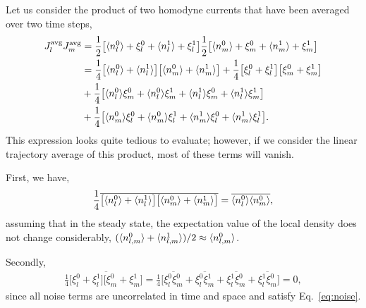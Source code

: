 Let us consider the product of two homodyne currents that have been averaged over two time steps, 
\begin{align}
\begin{split}
\label{eq:prodJ_expand}
    J_l^\text{avg} J_m^\text{avg} &= \frac{1}{2} \big[ \langle n_l^0\rangle + \xi_l^0 + \langle n_l^1\rangle + \xi_l^1 \big] \frac{1}{2} \big[ \langle n_m^0\rangle + \xi_m^0 + \langle n_m^1\rangle + \xi_m^1 \big] \\
    &= \frac{1}{4} \big[ \langle n_l^0\rangle + \langle n_l^1\rangle \big] \big[ \langle n_m^0\rangle + \langle n_m^1\rangle \big] + \frac{1}{4} \big[ \xi_l^0 + \xi_l^1 \big] \big[ \xi_m^0 + \xi_m^1 \big] \\
    &+ \frac{1}{4} \big[\langle n_l^0\rangle \xi_m^0 + \langle n_l^0\rangle \xi_m^1 + \langle n_l^1\rangle \xi_m^0 + \langle n_l^1\rangle \xi_m^1  \big] \\
    &+ \frac{1}{4} \big[\langle n_m^0\rangle \xi_l^0 + \langle n_m^0\rangle \xi_l^1 + \langle n_m^1\rangle \xi_l^0 + \langle n_m^1\rangle \xi_l^1  \big].
\end{split}
\end{align}
This expression looks quite tedious to evaluate; however, if we consider the linear trajectory average of this product, most of these terms will vanish.

First, we have, 
\begin{align}   
    \frac{1}{4} \overline {\big[ \langle n_l^0\rangle + \langle n_l^1\rangle \big] \big[ \langle n_m^0\rangle + \langle n_m^1\rangle \big]} = \overline{\langle n_l^0\rangle \langle n_m^0\rangle },
\end{align}
assuming that in the steady state, the expectation value of the local density does not change considerably, $(\langle n_{l,m}^0\rangle + \langle n_{l,m}^1\rangle)/2 \approx \langle n_{l,m}^0\rangle$.

Secondly, 
\begin{align}
    \frac{1}{4} \overline{\big[ \xi_l^0 + \xi_l^1 \big] \big[ \xi_m^0 + \xi_m^1 \big]} = \frac{1}{4} \big[ \overline{\xi_l^0 \xi_m^0} + \overline{\xi_l^0 \xi_m^1} + \overline{\xi_l^1 \xi_m^0} + \overline{\xi_l^1 \xi_m^0 } \big] = 0,
\end{align}
since all noise terms are uncorrelated in time and space and satisfy Eq.~\ref{eq:noise}.

